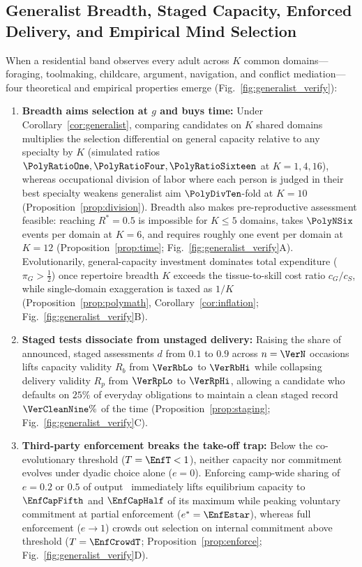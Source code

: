 \subsection{Generalist Breadth, Staged Capacity, Enforced Delivery, and Empirical Mind Selection}
When a residential band observes every adult across $K$ common domains---foraging, toolmaking, childcare, argument, navigation, and conflict mediation---four theoretical and empirical properties emerge (Fig.~\ref{fig:generalist_verify}):
\begin{enumerate}[leftmargin=1.4em,itemsep=1.5pt,topsep=2pt]
\item \textbf{Breadth aims selection at $g$ and buys time:} Under Corollary~\ref{cor:generalist}, comparing candidates on $K$ shared domains multiplies the selection differential on general capacity relative to any specialty by $K$ (simulated ratios $\PolyRatioOne,\PolyRatioFour,\PolyRatioSixteen$ at $K=1,4,16$), whereas occupational division of labor where each person is judged in their best specialty weakens generalist aim $\PolyDivTen$-fold at $K=10$ (Proposition~\ref{prop:division}). Breadth also makes pre-reproductive assessment feasible: reaching $R^*=0.5$ is impossible for $K\le 5$ domains, takes $\PolyNSix$ events per domain at $K=6$, and requires roughly one event per domain at $K=12$ (Proposition~\ref{prop:time}; Fig.~\ref{fig:generalist_verify}A). Evolutionarily, general-capacity investment dominates total expenditure ($\pi_G>\tfrac12$) once repertoire breadth $K$ exceeds the tissue-to-skill cost ratio $c_G/c_S$, while single-domain exaggeration is taxed as $1/K$ (Proposition~\ref{prop:polymath}, Corollary~\ref{cor:inflation}; Fig.~\ref{fig:generalist_verify}B).
\item \textbf{Staged tests dissociate from unstaged delivery:} Raising the share of announced, staged assessments $d$ from $0.1$ to $0.9$ across $n=\VerN$ occasions lifts capacity validity $R_b$ from $\VerRbLo$ to $\VerRbHi$ while collapsing delivery validity $R_p$ from $\VerRpLo$ to $\VerRpHi$, allowing a candidate who defaults on $25\%$ of everyday obligations to maintain a clean staged record $\VerCleanNine\%$ of the time (Proposition~\ref{prop:staging}; Fig.~\ref{fig:generalist_verify}C).
\item \textbf{Third-party enforcement breaks the take-off trap:} Below the co-evolutionary threshold ($T=\EnfT<1$), neither capacity nor commitment evolves under dyadic choice alone ($e=0$). Enforcing camp-wide sharing of $e=0.2$ or $0.5$ of output~\cite{woodburn1982,boehm1999} immediately lifts equilibrium capacity to $\EnfCapFifth$ and $\EnfCapHalf$ of its maximum while peaking voluntary commitment at partial enforcement ($e^*=\EnfEstar$), whereas full enforcement ($e\to 1$) crowds out selection on internal commitment above threshold ($T=\EnfCrowdT$; Proposition~\ref{prop:enforce}; Fig.~\ref{fig:generalist_verify}D).

\end{enumerate}
